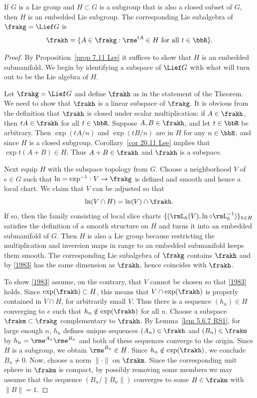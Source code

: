 \begin{thm}\label{thm closed subgroup}
    If $G$ is a Lie group and $H\subset G$ is a subgroup that is also a closed subset of $G$, then $H$ is an embedded Lie subgroup. The corresponding Lie subalgebra of $\frakg=\Lief G$ is 
    \[\frakh=\{A\in\frakg: \rme^{tA}\in H \text{ for all }t\in\bbR\}.\]
\end{thm}
\begin{proof}
    By Proposition~\ref{prop 7.11 Lee} it suffices to show that $H$ is an embedded submanifold. We begin by identifying a subspace of $\Lief G$ with what will turn out to be the Lie algebra of $H$.

    Let $\frakg=\Lief G$ and define $\frakh$ as in the statement of the Theorem. We need to show that $\frakh$ is a linear subspace of $\frakg$. It is obvious from the definition that $\frakh$ is closed under scalar multiplication: if $A\in\frakh$, then $tA\in\frakh$ for all $t\in \bbR$. Suppose $A,B\in\frakh$, and let $t \in\bbR$ be arbitrary. Then $\exp(tA/n)$ and $\exp(tB/n)$ are in $H$ for any $n\in \bbN$, and since $H$ is a closed subgroup, Corollary~\ref{cor 20.11 Lee} implies that $\exp t(A+B)\in H$. Thus $A+B\in\frakh$ and $\frakh$ is a subspace.

    Next equip $H$ with the subspace topology from $G$. Choose a neighborhood $V$ of $e\in G$ such that $\ln=\exp^{-1}:V\to \frakg$ is defined and smooth and hence a local chart. We claim that $V$ can be adjusted so that 
    \[\ln(V\cap H)=\ln(V)\cap \frakh.\label{1983}\]
    If so, then the family consisting of local slice charts $\{(\rmL_h(V),\ln\circ \rmL_{h}^{-1})\}_{h\in H}$ satisfies the definition of a smooth structure on $H$ and turns it into an embedded submanifold of $G$. Then $H$ is also a Lie group because restricting the multiplication and inversion maps in range to an embedded submanifold keeps them smooth. The corresponding Lie subalgebra of $\frakg$ contains $\frakh$ and by \eqref{1983} has the same dimension as $\frakh$, hence coincides with $\frakh$.

    To show \eqref{1983} assume, on the contrary, that $V$ cannot be chosen so that \eqref{1983} holds. Since $\exp(\frakh)\subset H$, this means that $V\cap \exp(\frakh)$ is properly contained in $V\cap H$, for arbitrarily small $V$. Thus there is a sequence $(h_n)\in H$ converging to $e$ such that $h_n\notin \exp(\frakh)$ for all $n$. Choose a subspace $\frakm\subset\frakg$ complementary to $\frakh$. By Lemma~\ref{lem 5.6.7 RS1}, for large enough $n$, $h_n$ defines unique sequences $(A_n)\in \frakh$ and $(B_n)\in \frakm$ by $h_n=\rme^{A_n}\rme^{B_n}$ and both of these sequences converge to the origin. Since $H$ is a subgroup, we obtain $\rme^{B_n}\in H$. Since $h_n\notin\exp(\frakh)$, we conclude $B_n\neq 0$. Now, choose a norm $\lVert\cdot\rVert$ on $\frakm$. Since the corresponding unit sphere in $\frakm$ is compact, by possibly removing some members we may assume that the sequence $(B_n/\lVert B_n\rVert)$ converges to some $B\in\frakm$ with $\lVert B\rVert=1$. 
    

\end{proof}
